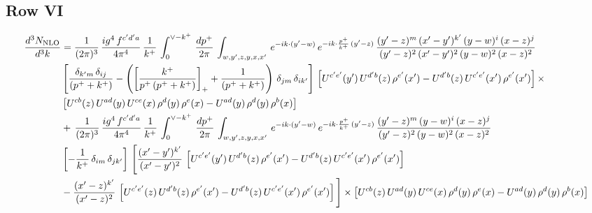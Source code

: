 \documentclass[9pt]{article}
\numberwithin{equation}{section}
\begin{document}
\subsection{Row VI}
\begin{align}
    \frac{d^{3}N_{\rm NLO}}{d^{3}k} & =  \frac{1}{(2\pi)^{3}}\, \frac{ig^{4}\,f^{c'd'a}}{4\pi^{4}}\, \frac{1}{k^{+}}\,\int_{0}^{\vee-k^{+}}\, \frac{dp^{+}}{2\pi}\, \int_{w,y',z,y,x,x'}\, e^{-ik\cdot (y'-w)}\, e^{-ik\cdot \frac{p^{+}}{k^{+}}\,(y'-z)}\,\frac{(y'-z)^{m}\,(x'-y')^{k'}\,(y-w)^{i}\,(x-z)^{j}}{(y'-z)^{2}\,(x'-y')^{2}\,(y-w)^{2}\,(x-z)^{2}}\notag \\ & \left[\frac{\delta_{k'm}\,\delta_{ij}}{(p^{+}+k^{+})}-\left(\left[\frac{k^{+}}{p^{+}\,(p^{+}+k^{+})}\right]_{+}+\frac{1}{(p^{+}+k^{+})}\right)\,\delta_{jm}\,\delta_{ik'}\right]\, \left[U^{c'e'}(y')\,U^{d'b}(z)\,\rho^{e'}(x')-U^{d'b}(z)\,U^{c'e'}(x')\,\rho^{e'}(x')\right]\times\notag \\ &  \left[U^{cb}(z)\,U^{ad}(y)\,U^{ce}(x)\,\rho^{d}(y)\,\rho^{e}(x)-U^{ad}(y)\,\rho^{d}(y)\,\rho^{b}(x)\right] \notag \\ &  +\,\frac{1}{(2\pi)^{3}}\, \frac{ig^{4}\,f^{c'd'a}}{4\pi^{4}}\, \frac{1}{k^{+}}\,\int_{0}^{\vee-k^{+}}\, \frac{dp^{+}}{2\pi}\, \int_{w,y',z,y,x,x'}\, e^{-ik\cdot (y'-w)}\, e^{-ik\cdot \frac{p^{+}}{k^{+}}\,(y'-z)}\,\frac{(y'-z)^{m}\,(y-w)^{i}\,(x-z)^{j}}{(y'-z)^{2}\,(y-w)^{2}\,(x-z)^{2}}\notag \\ &  \left[-\frac{1}{k^{+}}\, \delta_{im}\, \delta_{jk'}\right]\, \Bigg[\frac{(x'-y')^{k'}}{(x'-y')^{2}}\,\left[U^{c'e'}(y')\,U^{d'b}(z)\,\rho^{e'}(x')-U^{d'b}(z)\,U^{c'e'}(x')\,\rho^{e'}(x')\right]\notag \\ & -\frac{(x'-z)^{k'}}{(x'-z)^{2}}\,\left[U^{c'e'}(z)\,U^{d'b}(z)\,\rho^{e'}(x')-U^{d'b}(z)\,U^{c'e'}(x')\,\rho^{e'}(x')\right]\Bigg]\times    \left[U^{cb}(z)\,U^{ad}(y)\,U^{ce}(x)\,\rho^{d}(y)\,\rho^{e}(x)-U^{ad}(y)\,\rho^{d}(y)\,\rho^{b}(x)\right]
\end{align}
\end{document}
